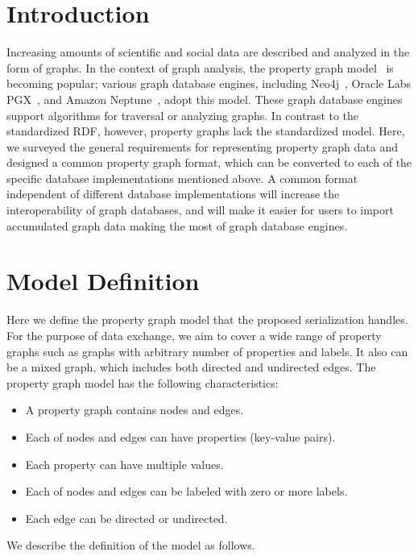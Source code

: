 \documentclass[runningheads]{llncs}
\begin{document}
\section{Introduction}
Increasing amounts of scientific and social data are described and analyzed in the form of graphs.
In the context of graph analysis, the property graph model~\cite{angles} is becoming popular; various graph database engines, including Neo4j~\cite{neo4j}, Oracle Labs PGX~\cite{pgx}, and Amazon Neptune~\cite{neptune}, adopt this model. These graph database engines support algorithms for traversal or analyzing graphs. 
In contrast to the standardized RDF, however, 
property graphs lack the standardized model.
Here, we surveyed the general requirements for representing property graph data and designed a common property graph format, which can be converted to each of the specific database implementations mentioned above. A common format independent of different database implementations will increase the interoperability of graph databases, and will make it easier for users to import accumulated graph data making the most of graph database engines.

\section{Model Definition}
Here we define the property graph model that the proposed serialization handles.
For the purpose of data exchange, we aim to cover a wide range of property graphs such as graphs with arbitrary number of properties and labels. It also can be a mixed graph, which includes both directed and undirected edges. The property graph model has the following characteristics:

\begin{itemize}
    \item A property graph contains nodes and edges.
    \item Each of nodes and edges can have properties (key-value pairs).
    \item Each property can have multiple values.
    \item Each of nodes and edges can be labeled with zero or more labels.
    \item Each edge can be directed or undirected.
\end{itemize}
We describe the definition of the model as follows.
\end{document}
